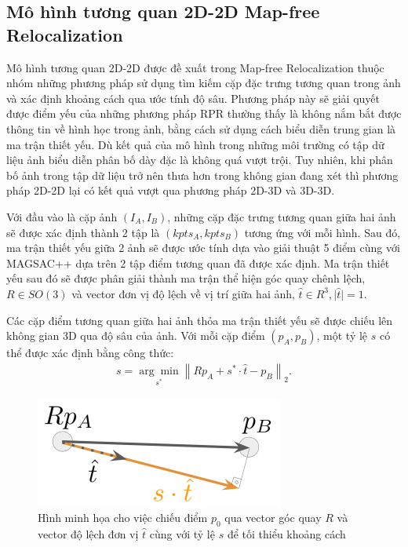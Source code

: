 \subsection{Mô hình tương quan 2D-2D Map-free Relocalization \cite{arnold2022mapfree}}

Mô hình tương quan 2D-2D được đề xuất trong Map-free Relocalization \cite{arnold2022mapfree} thuộc nhóm những phương pháp sử dụng tìm kiếm cặp đặc trưng tương quan trong ảnh và xác định khoảng cách qua ước tính độ sâu. Phương pháp này sẽ giải quyết được điểm yếu của những phương pháp RPR thường thấy là không nắm bắt được thông tin về hình học trong ảnh, bằng cách sử dụng cách biểu diễn trung gian là ma trận thiết yếu. Dù kết quả của mô hình trong những môi trường có tập dữ liệu ảnh biểu diễn phân bố dày đặc là không quá vượt trội. Tuy nhiên, khi phân bố ảnh trong tập dữ liệu trở nên thưa hơn trong không gian đang xét thì phương pháp 2D-2D lại có kết quả vượt qua phương pháp 2D-3D và 3D-3D.

Với đầu vào là cặp ảnh $(I_A, I_B)$, những cặp đặc trưng tương quan giữa hai ảnh sẽ được xác định thành 2 tập là $(kpts_A, kpts_B)$ tương ứng với mỗi hình. Sau đó, ma trận thiết yếu giữa 2 ảnh sẽ được ước tính dựa vào giải thuật 5 điểm \cite{nister2004efficient} cùng với MAGSAC++ \cite{barath2020magsac++} dựa trên 2 tập điểm tương quan đã được xác định. Ma trận thiết yếu sau đó sẽ được phân giải thành ma trận thể hiện góc quay chênh lệch, $R \in SO(3)$ và vector đơn vị độ lệch về vị trí giữa hai ảnh, $\hat{t} \in R^{3}, \lvert \hat{t} \rvert = 1$.

Các cặp điểm tương quan giữa hai ảnh thỏa ma trận thiết yếu sẽ được chiếu lên không gian 3D qua độ sâu của ảnh. Với mỗi cặp điểm $(p_A,p_B)$, một tỷ lệ $s$ có thể được xác định bằng công thức:
$$
  \begin{aligned}
    s=\underset{s^*}{\arg \min }\left\|R p_A+s^* \cdot \hat{t}-p_B\right\|_2 .
  \end{aligned}
$$

\begin{figure}[H]
  \centering
  \includegraphics[scale=1]{pics/Proposal/reprojection.png}
  \caption[Minh họa cho việc xác định tỷ lệ $s$ bằng độ sâu ảnh]{Hình minh họa cho việc chiếu điểm $p_0$ qua vector góc quay $R$ và vector độ lệch đơn vị $\hat{t}$ cùng với tỷ lệ $s$ để tối thiểu khoảng cách \cite{arnold2022mapfree}}
\end{figure}

